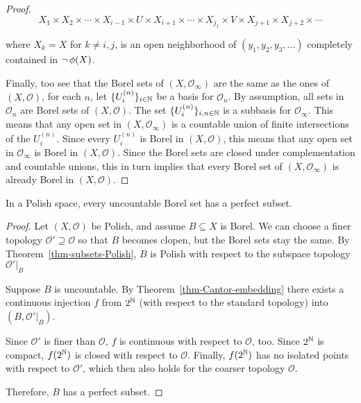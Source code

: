 \begin{proof}
\begin{equation}
X_1 \times X_2 \times \cdots \times  X_{i-1} \times U \times X_{i+1} \times \cdots \times X_{j_1} \times V \times X_{j+1} \times X_{j+2} \times \cdots
\end{equation}

where $X_k = X$ for $k \neq i,j$, is an open neighborhood of $(y_1,y_2,y_3, \dots)$ completely contained in $\neg \, \phi(X)$.

Finally, too see that the Borel sets of $(X, \mathcal{O}_\infty)$ are the same as the ones of $(X,\mathcal{O})$, for each $n$, let $\{U^{(n)}_i\}_{i \in \mathbb{N}}$ be a basis for $\mathcal{O}_n$. By assumption, all sets in $\mathcal{O}_n$ are Borel sets of $(X, \mathcal{O})$. The set $\{U^{(n)}_i\}_{i,n \in \mathbb{N}}$ is a subbasis for $\mathcal{O}_\infty$. This means that any open set in $(X, \mathcal{O}_\infty)$ is a countable union of finite intersections of the $U^{(n)}_i$. Since every $U^{(n)}_i$ is Borel in $(X, \mathcal{O})$, this means that any open set in $\mathcal{O}_\infty$ is Borel in $(X, \mathcal{O})$. Since the Borel sets are closed under complementation and countable unions, this in turn implies that every Borel set of $(X, \mathcal{O}_\infty)$ is already Borel in $(X, \mathcal{O})$.

\end{proof}\begin{corollary}\label{cor-perfect-borel}In a Polish space, every uncountable Borel set has a perfect subset.

\end{corollary}\begin{proof}Let $(X,\mathcal{O})$ be Polish, and assume $B \subseteq X$ is Borel. We can choose a finer topology $\mathcal{O}' \supseteq \mathcal{O}$ so that $B$ becomes clopen, but the Borel sets stay the same. By Theorem~\ref{thm-subsets-Polish}, $B$ is Polish with respect to the subspace topology $\mathcal{O}'|_B$

Suppose $B$ is uncountable. By Theorem~\ref{thm-Cantor-embedding} there exists a continuous injection $f$ from $2^{\mathbb{N}}$ (with respect to the standard topology) into $(B,\mathcal{O}'|_B)$.

Since $\mathcal{O}'$ is finer than $\mathcal{O}$, $f$ is continuous with respect to $\mathcal{O}$, too. Since $2^{\mathbb{N}}$ is compact, $f(2^{\mathbb{N}})$ is closed with respect to $\mathcal{O}$. Finally, $f(2^{\mathbb{N}})$ has no isolated points with respect to $\mathcal{O}'$, which then also holds for the coarser topology $\mathcal{O}$.

Therefore, $B$ has a perfect subset.

\end{proof}